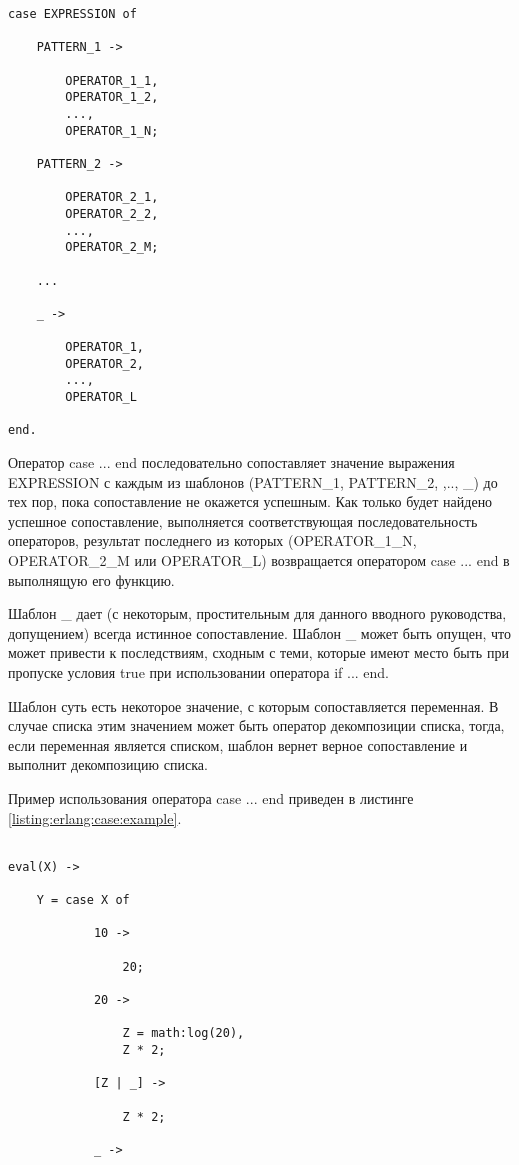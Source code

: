 \begin{itemize}
\begin{lstlisting}
case EXPRESSION of

	PATTERN_1 ->

		OPERATOR_1_1,
		OPERATOR_1_2,
		...,
		OPERATOR_1_N;

	PATTERN_2 ->

		OPERATOR_2_1,
		OPERATOR_2_2,
		...,
		OPERATOR_2_M;

	...

	_ ->

		OPERATOR_1,
		OPERATOR_2,
		...,
		OPERATOR_L

end.

\end{lstlisting}
\mylistingend

		Оператор case ... end последовательно сопоставляет значение выражения EXPRESSION с каждым из шаблонов (PATTERN\_1, PATTERN\_2, ,.., \_) до тех пор, пока сопоставление не окажется успешным. Как только будет найдено успешное сопоставление, выполняется соответствующая последовательность операторов, результат последнего из которых (OPERATOR\_1\_N, OPERATOR\_2\_M или OPERATOR\_L) возвращается оператором case ... end в выполнящую его функцию.

		Шаблон \_ дает (с некоторым, простительным для данного вводного руководства, допущением) всегда истинное сопоставление. Шаблон \_ может быть опущен, что может привести к последствиям, сходным с теми, которые имеют место быть при пропуске условия true при использовании оператора if ... end.

		Шаблон суть есть некоторое значение, с которым сопоставляется переменная. В случае списка этим значением может быть оператор декомпозиции списка, тогда, если переменная является списком, шаблон вернет верное сопоставление и выполнит декомпозицию списка.

		Пример использования оператора case ... end приведен в листинге \ref{listing:erlang:case:example}.

\begin{lstlisting}

eval(X) ->

	Y = case X of

			10 ->

				20;

			20 ->

				Z = math:log(20),
				Z * 2;

			[Z | _] ->

				Z * 2;

			_ ->


\end{lstlisting}
\end{itemize}
